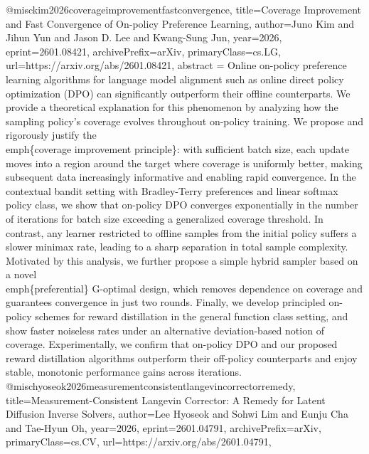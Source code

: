 {}@misc{kim2026coverageimprovementfastconvergence,
      title={Coverage Improvement and Fast Convergence of On-policy Preference Learning}, 
      author={Juno Kim and Jihun Yun and Jason D. Lee and Kwang-Sung Jun},
      year={2026},
      eprint={2601.08421},
      archivePrefix={arXiv},
      primaryClass={cs.LG},
      url={https://arxiv.org/abs/2601.08421},
      abstract = {Online on-policy preference learning algorithms for language model alignment such as online direct policy optimization (DPO) can significantly outperform their offline counterparts. We provide a theoretical explanation for this phenomenon by analyzing how the sampling policy's coverage evolves throughout on-policy training. We propose and rigorously justify the \\emph\{coverage improvement principle\}: with sufficient batch size, each update moves into a region around the target where coverage is uniformly better, making subsequent data increasingly informative and enabling rapid convergence. In the contextual bandit setting with Bradley-Terry preferences and linear softmax policy class, we show that on-policy DPO converges exponentially in the number of iterations for batch size exceeding a generalized coverage threshold. In contrast, any learner restricted to offline samples from the initial policy suffers a slower minimax rate, leading to a sharp separation in total sample complexity. Motivated by this analysis, we further propose a simple hybrid sampler based on a novel \\emph\{preferential\} G-optimal design, which removes dependence on coverage and guarantees convergence in just two rounds. Finally, we develop principled on-policy schemes for reward distillation in the general function class setting, and show faster noiseless rates under an alternative deviation-based notion of coverage. Experimentally, we confirm that on-policy DPO and our proposed reward distillation algorithms outperform their off-policy counterparts and enjoy stable, monotonic performance gains across iterations.}
}@misc{hyoseok2026measurementconsistentlangevincorrectorremedy,
      title={Measurement-Consistent Langevin Corrector: A Remedy for Latent Diffusion Inverse Solvers}, 
      author={Lee Hyoseok and Sohwi Lim and Eunju Cha and Tae-Hyun Oh},
      year={2026},
      eprint={2601.04791},
      archivePrefix={arXiv},
      primaryClass={cs.CV},
      url={https://arxiv.org/abs/2601.04791},
}
